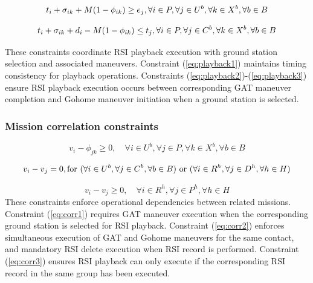 \documentclass[preprint,3p,12pt,authoryear]{elsarticle}
\begin{document}
\begin{equation}
t_i+\sigma_{ik}+M(1-\phi_{ik}) \ge e_j, \quad \\ \forall i \in P, \forall j \in U^b, \forall k \in X^b, \forall b \in B \label{eq:playback2}
\end{equation}

\begin{equation}
t_i+\sigma_{ik}+d_i-M(1-\phi_{ik}) \le t_j, \quad \\ \forall i \in P, \forall j \in C^b, \forall k \in X^b, \forall b \in B \label{eq:playback3}
\end{equation}

These constraints coordinate RSI playback execution with ground station selection and associated maneuvers. Constraint (\ref{eq:playback1}) maintains timing consistency for playback operations. Constraints (\ref{eq:playback2})-(\ref{eq:playback3}) ensure RSI playback execution occurs between corresponding GAT maneuver completion and Gohome maneuver initiation when a ground station is selected.

\subsubsection{Mission correlation constraints}
\begin{equation}
v_i-\phi_{jk} \ge 0, \quad \forall i \in U^b, \forall j \in P, \forall k \in X^b, \forall b \in B \label{eq:corr1}
\end{equation}

\begin{equation}
v_i-v_j = 0, \quad \\ \text{for } (\forall i \in U^b, \forall j \in C^b, \forall b \in B) \text{ or } (\forall i \in R^h, \forall j \in D^h, \forall h \in H) \label{eq:corr2}
\end{equation}

\begin{equation}
v_i-v_j \ge 0, \quad \forall i \in R^h, \forall j \in P^h, \forall h \in H \label{eq:corr3}
\end{equation}
These constraints enforce operational dependencies between related missions. Constraint (\ref{eq:corr1}) requires GAT maneuver execution when the corresponding ground station is selected for RSI playback. Constraint (\ref{eq:corr2}) enforces simultaneous execution of GAT and Gohome maneuvers for the same contact, and mandatory RSI delete execution when RSI record is performed. Constraint (\ref{eq:corr3}) ensures RSI playback can only execute if the corresponding RSI record in the same group has been executed.
\end{document}
